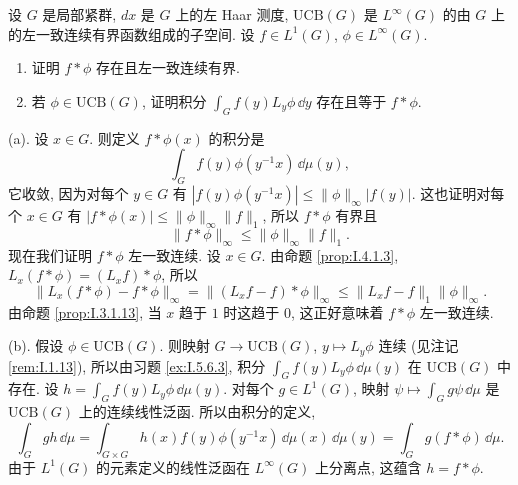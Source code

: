 \begin{exercise}
\label{ex:I.5.6.6}
设 $G$ 是局部紧群, $dx$ 是 $G$ 上的左 Haar 测度, $\mathrm{UCB}(G)$ 是 $L^{\infty}(G)$ 的由 $G$ 上的左一致连续有界函数组成的子空间.
设 $f \in L^1(G)$, $\phi \in L^{\infty}(G)$.
\begin{enumerate}
\item[(a)] 证明 $f * \phi$ 存在且左一致连续有界.
\item[(b)] 若 $\phi \in \mathrm{UCB}(G)$, 证明积分 $\int_G f(y)L_y\phi\,\dd y$ 存在且等于 $f * \phi$.
\end{enumerate}
\end{exercise}

\begin{solution}
(a). 设 $x \in G$. 则定义 $f * \phi(x)$ 的积分是
\[
\int_G f(y)\phi(y^{-1}x)\,\dd\mu(y),
\]
它收敛, 因为对每个 $y \in G$ 有 $|f(y)\phi(y^{-1}x)| \leq \|\phi\|_{\infty}|f(y)|$. 这也证明对每个 $x \in G$ 有 $|f * \phi(x)| \leq \|\phi\|_{\infty}\|f\|_1$, 所以 $f * \phi$ 有界且
\[
\|f * \phi\|_{\infty} \leq \|\phi\|_{\infty}\|f\|_1.
\]
现在我们证明 $f * \phi$ 左一致连续. 设 $x \in G$. 由命题 \ref{prop:I.4.1.3}, $L_x(f * \phi) = (L_xf) * \phi$, 所以
\[
\|L_x(f * \phi) - f * \phi\|_{\infty} = \|(L_xf - f) * \phi\|_{\infty} \leq \|L_xf - f\|_1\|\phi\|_{\infty}.
\]
由命题 \ref{prop:I.3.1.13}, 当 $x$ 趋于 $1$ 时这趋于 $0$, 这正好意味着 $f * \phi$ 左一致连续.

(b). 假设 $\phi \in \mathrm{UCB}(G)$. 则映射 $G \to \mathrm{UCB}(G)$, $y \longmapsto L_y\phi$ 连续 (见注记 \ref{rem:I.1.13}), 所以由习题 \ref{ex:I.5.6.3}, 积分 $\int_G f(y)L_y\phi\,\dd\mu(y)$ 在 $\mathrm{UCB}(G)$ 中存在. 设 $h = \int_G f(y)L_y\phi\,\dd\mu(y)$.
对每个 $g \in L^1(G)$, 映射 $\psi \longmapsto \int_G g\psi\,\dd\mu$ 是 $\mathrm{UCB}(G)$ 上的连续线性泛函. 所以由积分的定义,
\[
\int_G gh\,\dd\mu = \int_{G \times G}h(x)f(y)\phi(y^{-1}x)\,\dd\mu(x)\,\dd\mu(y) = \int_G g(f * \phi)\,\dd\mu.
\]
由于 $L^1(G)$ 的元素定义的线性泛函在 $L^{\infty}(G)$ 上分离点, 这蕴含 $h = f * \phi$.
\end{solution}

